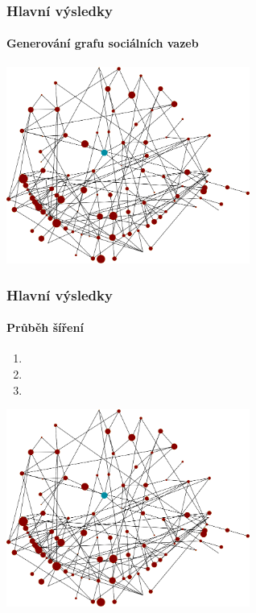 \documentclass[xcolor=dvipsnames]{beamer}
\begin{document}
  \begin{frame}
    \frametitle{Hlavní výsledky}
    \framesubtitle{Generování grafu sociálních vazeb}
    \begin{center}\includegraphics[width=0.6\textwidth]{oriflame7_view1.png}\end{center}
  \end{frame}
  \begin{frame}
    \frametitle{Hlavní výsledky}
    \framesubtitle{Průběh šíření}
    \begin{enumerate}
      \item 
      \item
      \item
    \end{enumerate}
    \begin{center}\includegraphics[width=0.6\textwidth]{oriflame7_view1.png}\end{center}
  \end{frame}    
\end{document}
